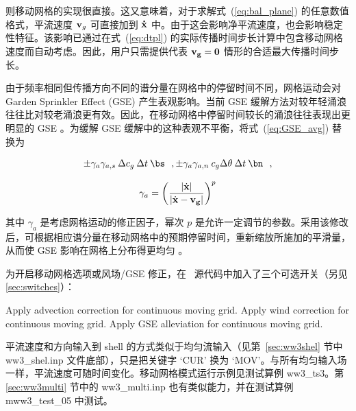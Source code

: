 \noindent
则移动网格的实现很直接。这又意味着，对于求解式~(\ref{eq:bal_plane}) 的任意数值格式，平流速度 ${\bf{v}}_g$ 可直接加到 ${\bf\dot{x}}$ 中。由于这会影响净平流速度，也会影响稳定性特征。该影响已通过在式~(\ref{eq:dtpl}) 的实际传播时间步长计算中包含移动网格速度而自动考虑。因此，用户只需提供代表 $\bf{v}_g = 0$ 情形的合适最大传播时间步长。

由于频率相同但传播方向不同的谱分量在网格中的停留时间不同，网格运动会对 Garden Sprinkler Effect (GSE) 产生表观影响。当前 GSE 缓解方法对较年轻涌浪往往比对较老涌浪更有效。因此，在移动网格中停留时间较长的涌浪往往表现出更明显的 GSE \citep[见][]{tol:OMOD05b}。为缓解 GSE 缓解中的这种表观不平衡，将式~(\ref{eq:GSE_avg}) 替换为

\begin{equation}
\pm \gamma_a \gamma_{a,s} \: \Delta c_g \: \Delta t \: \bs \:\:\: ,
\pm \gamma_a \gamma_{a,n} \: c_g \Delta \theta \: \Delta t \: \bn \:\:\: ,
\label{eq:move_GSE_avg1}
\end{equation}

\begin{equation}
\gamma_a = \left ( \frac{|\dot{\bf{x}}|}{|\dot{\bf{x}}-\bf{v}_g|}
\right ) ^{p}
\label{eq:move_GSE_avg2}
\end{equation}

\noindent
其中 $\gamma_a$ 是考虑网格运动的修正因子，幂次 $p$ 是允许一定调节的参数。采用该修改后，可根据相应谱分量在移动网格中的预期停留时间，重新缩放所施加的平滑量，从而使 GSE 影响在网格上分布得更均匀 \citep[见][]{tol:OMOD05b}。


为开启移动网格选项或风场/GSE 修正，在 \ws\ 源代码中加入了三个可选开关（另见 \para\ref{sec:switches}）：

\begin{slist}
 {Apply advection correction for continuous moving grid.}
 {Apply wind correction for continuous moving grid.}
 {Apply GSE alleviation for
           continuous moving grid.}
\end{slist}

\noindent
平流速度和方向输入到 shell 的方式类似于均匀流输入（见第~\ref{sec:ww3shel} 节中 {\file ww3\_shel.inp} 文件底部），只是把关键字 `{\code CUR}' 换为 `{\code MOV}'。与所有均匀输入场一样，平流速度可随时间变化。移动网格模式运行示例见测试算例 {\file ww3\_ts3}。第 \ref{sec:ww3multi} 节中的 {\file ww3\_multi.inp} 也有类似能力，并在测试算例 {\file mww3\_test\_05} 中测试。
